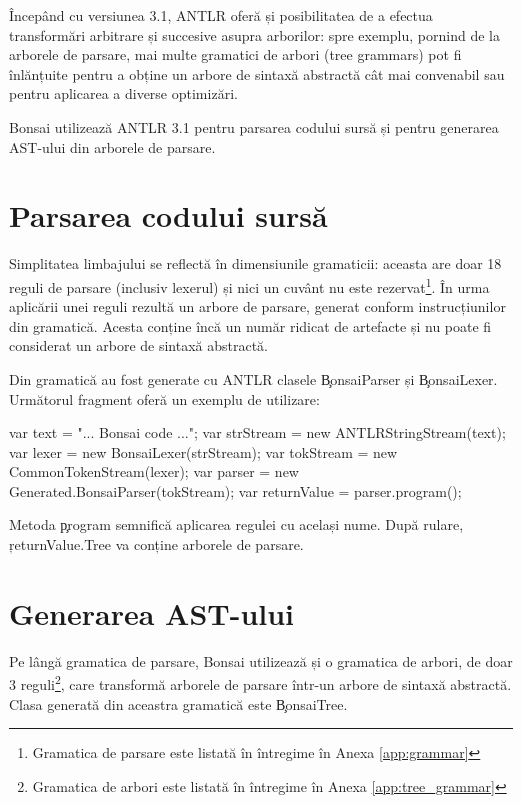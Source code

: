 \documentclass[12pt,a4paper]{memoir}
\begin{document}
Începând cu versiunea 3.1, ANTLR oferă și posibilitatea de a efectua transformări arbitrare și succesive asupra arborilor: spre exemplu, pornind de la arborele de parsare, mai multe gramatici de arbori (tree grammars) pot fi înlănțuite pentru a obține un arbore de sintaxă abstractă cât mai convenabil sau pentru aplicarea a diverse optimizări\cite{antlr_tree_grammars}\cite[cap. 8]{definitive_antlr_reference}.

Bonsai utilizează ANTLR 3.1 pentru parsarea codului sursă și pentru generarea AST-ului din arborele de parsare.

\section{Parsarea codului sursă}

Simplitatea limbajului se reflectă în dimensiunile gramaticii: aceasta are doar 18 reguli de parsare (inclusiv lexerul) și nici un cuvânt nu este rezervat\footnote{Gramatica de parsare este listată în întregime în Anexa \ref{app:grammar}}. În urma aplicării unei reguli rezultă un arbore de parsare, generat conform instrucțiunilor din gramatică. Acesta conține încă un număr ridicat de artefacte și nu poate fi considerat un arbore de sintaxă abstractă.

Din gramatică au fost generate cu ANTLR clasele \c{BonsaiParser} și \c{BonsaiLexer}. Următorul fragment oferă un exemplu de utilizare:

\begin{code}
var text = "... Bonsai code ...";
var strStream = new ANTLRStringStream(text);
var lexer = new BonsaiLexer(strStream);
var tokStream = new CommonTokenStream(lexer);
var parser = new Generated.BonsaiParser(tokStream);
var returnValue = parser.program();
\end{code}

Metoda \c{program} semnifică aplicarea regulei cu același nume. După rulare, \c{returnValue.Tree} va conține arborele de parsare.

\section{Generarea AST-ului}

Pe lângă gramatica de parsare, Bonsai utilizează și o gramatica de arbori, de doar 3 reguli\footnote{Gramatica de arbori este listată în întregime în Anexa \ref{app:tree_grammar}}, care transformă arborele de parsare într-un arbore de sintaxă abstractă. Clasa generată din aceastra gramatică este \c{BonsaiTree}.
\end{document}
